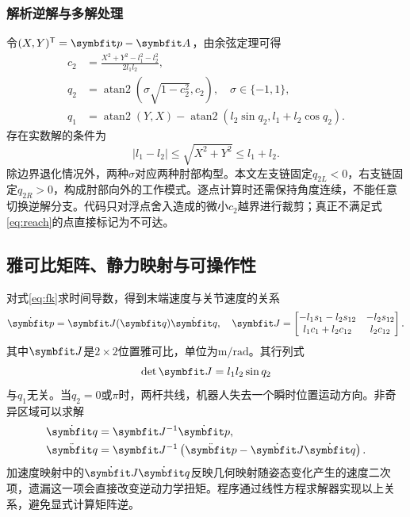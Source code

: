 \subsubsection{解析逆解与多解处理}

令$(X,Y)^\T=\vect p-\vect A$，由余弦定理可得
\begin{align}
c_2&=\frac{X^2+Y^2-l_1^2-l_2^2}{2l_1l_2},\\
q_2&=\operatorname{atan2}\!\left(\sigma\sqrt{1-c_2^2},c_2\right),\quad \sigma\in\{-1,1\},\\
q_1&=\operatorname{atan2}(Y,X)-\operatorname{atan2}(l_2\sin q_2,l_1+l_2\cos q_2).
\label{eq:ik}
\end{align}
存在实数解的条件为
\begin{equation}
|l_1-l_2|\leq\sqrt{X^2+Y^2}\leq l_1+l_2.
\label{eq:reach}
\end{equation}
除边界退化情况外，两种$\sigma$对应两种肘部构型。本文左支链固定$q_{2L}<0$，右支链固定$q_{2R}>0$，构成肘部向外的工作模式。逐点计算时还需保持角度连续，不能任意切换逆解分支。代码只对浮点舍入造成的微小$c_2$越界进行裁剪；真正不满足式\eqref{eq:reach}的点直接标记为不可达。

\subsection{雅可比矩阵、静力映射与可操作性}
\label{sec:jacobian}

对式\eqref{eq:fk}求时间导数，得到末端速度与关节速度的关系
\begin{equation}
\dot{\vect p}=\vect J(\vect q)\dot{\vect q},\quad
\vect J=\begin{bmatrix}
-l_1s_1-l_2s_{12}&-l_2s_{12}\\
l_1c_1+l_2c_{12}&l_2c_{12}
\end{bmatrix}.
\label{eq:jac}
\end{equation}
其中$\vect J$是$2\times2$位置雅可比，单位为$\mathrm{m/rad}$。其行列式
\begin{equation}
\det\vect J=l_1l_2\sin q_2
\end{equation}
与$q_1$无关。当$q_2=0$或$\pi$时，两杆共线，机器人失去一个瞬时位置运动方向。非奇异区域可以求解
\begin{align}
\dot{\vect q}&=\vect J^{-1}\dot{\vect p},\\
\ddot{\vect q}&=\vect J^{-1}\left(\ddot{\vect p}-\dot{\vect J}\dot{\vect q}\right).
\label{eq:qdd}
\end{align}
加速度映射中的$\dot{\vect J}\dot{\vect q}$反映几何映射随姿态变化产生的速度二次项，遗漏这一项会直接改变逆动力学扭矩。程序通过线性方程求解器实现以上关系，避免显式计算矩阵逆。

